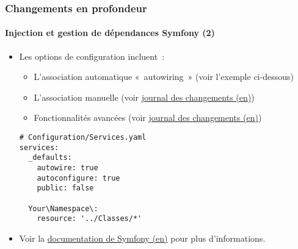 
\begin{frame}[fragile]
	\frametitle{Changements en profondeur}
	\framesubtitle{Injection et gestion de dépendances Symfony (2)}

	\lstset{basicstyle=\tiny\ttfamily}

	\begin{itemize}
		\item Les options de configuration incluent~:

			\begin{itemize}
				\item L'association automatique «~autowiring~» (voir l'exemple ci-dessous)
				\item L'association manuelle
					(voir \href{https://docs.typo3.org/c/typo3/cms-core/master/en-us/Changelog/10.0/Feature-84112-SymfonyDependencyInjectionForCoreAndExtbase.html}{journal des changements (en)})
				\item Fonctionnalités avancées
					(voir \href{https://docs.typo3.org/c/typo3/cms-core/master/en-us/Changelog/10.0/Feature-84112-SymfonyDependencyInjectionForCoreAndExtbase.html}{journal des changements (en)})
			\end{itemize}
\begin{lstlisting}
# Configuration/Services.yaml
services:
  _defaults:
    autowire: true
    autoconfigure: true
    public: false

  Your\Namespace\:
    resource: '../Classes/*'
\end{lstlisting}

		\item Voir la \href{https://symfony.com/doc/current/service_container.html}{documentation de Symfony (en)} pour plus d'informations.

	\end{itemize}

\end{frame}


